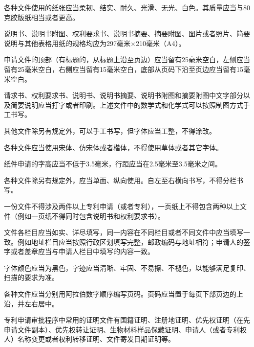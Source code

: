 各种文件使用的纸张应当柔韧、结实、耐久、光滑、无光、白色。其质量应当与80克胶版纸相当或者更高。

说明书、说明书附图、权利要求书、说明书摘要、摘要附图、图片或者照片、简要说明与其他表格用纸的规格均应为297毫米×210毫米（A4）。

申请文件的顶部（有标题的，从标题上沿至页边）应当留有25毫米空白，左侧应当留有25毫米空白，右侧应当留有15毫米空白，底部从页码下沿至页边应当留有15毫米空白。

请求书、权利要求书、说明书、说明书摘要、说明书附图和摘要附图中文字部分以及简要说明应当打字或者印刷。上述文件中的数学式和化学式可以按照制图方式手工书写。

其他文件除另有规定外，可以手工书写，但字体应当工整，不得涂改。

各种文件应当使用宋体、仿宋体或者楷体，不得使用草体或者其它字体。

纸件申请的字高应当不低于3.5毫米，行距应当在2.5毫米至3.5毫米之间。

各种文件除另有规定外，应当单面、纵向使用。自左至右横向书写，不得分栏书写。

一份文件不得涉及两件以上专利申请（或者专利），一页纸上不得包含两种以上文件（例如一页纸不得同时包含说明书和权利要求书）。

文件各栏目应当如实、详尽填写，同一内容在不同栏目或者不同文件中应当填写一致。例如地址栏目应当按照行政区划填写完整，邮政编码与地址相符；申请人的签字或者盖章应当与申请人栏目中填写的内容一致。

字体颜色应当为黑色，字迹应当清晰、牢固、不易擦、不褪色，以能够满足复印、扫描的要求为准。

各种文件应当分别用阿拉伯数字顺序编写页码。页码应当置于每页下部页边的上沿，并左右居中。

专利申请审批程序中常用的证明文件有国籍证明、注册地证明、优先权证明（在先申请文件副本）、优先权转让证明、生物材料样品保藏证明、申请人（或者专利权人）名称变更或者权利转移证明、文件寄发日期证明等。

